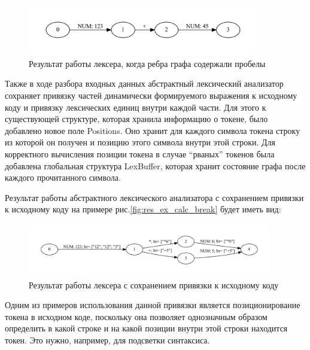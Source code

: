 \documentclass{matmex-diploma}
\begin{document}
\begin{enumerate}
\begin{figure}[h!]
\begin{center}
\includegraphics[width=0.9\textwidth]{res_ex_space}
\caption{Результат работы лексера, когда ребра графа содержали пробелы}
\label{fig:res_ex_space} 
\end{center}
\end{figure}

Также в ходе разбора входных данных абстрактный лексический анализатор сохраняет привязку частей динамически формируемого выражения к исходному коду и 
привязку лексических единиц внутри каждой части. Для этого к существующей структуре, которая хранила информацию о токене, было добавлено новое поле Positions.
Оно хранит для каждого символа токена строку из которой он получен и позицию этого символа внутри этой строки.  Для корректного вычисления позиции токена в
случае “рваных” токенов была добавлена глобальная структура LexBuffer, которая хранит состояние графа после каждого прочитанного символа. 

Результат работы абстрактного лексического анализатора с сохранением привязки к исходному коду на примере рис.\ref{fig:res_ex_calc_break} будет иметь вид:

\begin{figure}[h!]
\begin{center}
\includegraphics[width=0.95\textwidth]{res_ex_calc_bounded}
\caption{Результат работы лексера с сохранением привязки к исходному коду}
\label{fig:res_ex_calc_bounded} 
\end{center}
\end{figure}	


Одним из примеров использования данной привязки является позиционирование токена в исходном коде, поскольку она позволяет однозначным образом определить
в какой строке и на какой позиции внутри этой строки находится токен. Это нужно, например, для подсветки синтаксиса. 


\end{enumerate}
\end{document}
